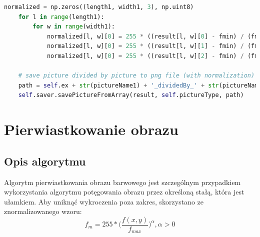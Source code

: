 \documentclass[a4paper,12pt, titlepage]{report}
\begin{document}
\begin{lstlisting}[language=Python]
    normalized = np.zeros((length1, width1, 3), np.uint8)
    for l in range(length1):
        for w in range(width1):
            normalized[l, w][0] = 255 * ((result[l, w][0] - fmin) / (fmax - fmin))
            normalized[l, w][0] = 255 * ((result[l, w][1] - fmin) / (fmax - fmin))
            normalized[l, w][0] = 255 * ((result[l, w][2] - fmin) / (fmax - fmin))

    # save picture divided by picture to png file (with normalization)
    path = self.ex + str(pictureName1) + '_dividedBy_' + str(pictureName2) + '_normalized.png'
    self.saver.savePictureFromArray(result, self.pictureType, path)
\end{lstlisting}

\section{Pierwiastkowanie obrazu}
\subsection*{Opis algorytmu}
\par Algorytm pierwiastkowania obrazu barwowego jest szczególnym przypadkiem wykorzystania algorytmu potęgowania obrazu przez określoną stałą, która jest ułamkiem. Aby uniknąć wykroczenia poza zakres, skorzystano ze znormalizowanego wzoru: \[f_{m}=255*\Big(\frac{f(x,y)}{f_{max}}\Big)^{\alpha},  \alpha>0\]
\end{document}
